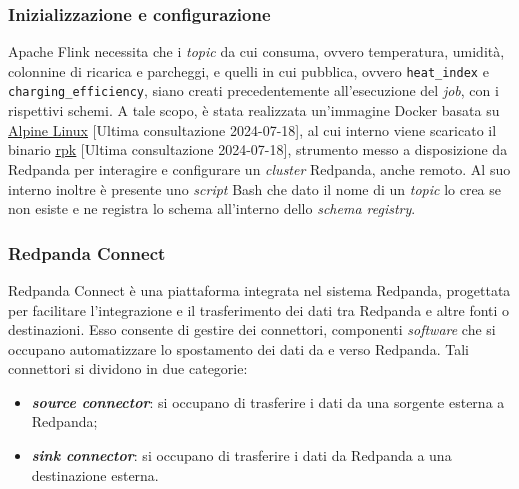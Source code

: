 \subsubsection{Inizializzazione e configurazione}
Apache Flink necessita che i \textit{topic} da cui consuma, ovvero temperatura, umidità, colonnine di ricarica e parcheggi, e quelli in cui pubblica, ovvero \texttt{heat\_index} e \\\texttt{charging\_efficiency},
siano creati precedentemente all'esecuzione del \textit{job}, con i rispettivi schemi. A tale scopo, è stata realizzata un'immagine Docker basata su \href{https://hub.docker.com/_/alpine}{\underline{Alpine Linux}} [Ultima consultazione 2024-07-18],
al cui interno viene scaricato il binario \href{https://docs.redpanda.com/current/get-started/intro-to-rpk/}{\underline{rpk}} [Ultima consultazione 2024-07-18], strumento
messo a disposizione da Redpanda per interagire e configurare un \textit{cluster} Redpanda, anche remoto. Al suo interno inoltre è presente uno \textit{script} Bash che
dato il nome di un \textit{topic} lo crea se non esiste e ne registra lo schema all'interno dello \textit{schema registry}.

\subsubsection{Redpanda Connect}\label{redpanda_connect}
Redpanda Connect è una piattaforma integrata nel sistema Redpanda, progettata per facilitare l'integrazione e il trasferimento dei dati tra Redpanda e altre fonti o destinazioni.
Esso consente di gestire dei connettori, componenti \textit{software} che si occupano automatizzare lo spostamento dei dati da e verso Redpanda. Tali connettori si dividono in due categorie:
\begin{itemize}
	\item \textbf{\textit{source connector}}: si occupano di trasferire i dati da una sorgente esterna a Redpanda;
	\item \textbf{\textit{sink connector}}: si occupano di trasferire i dati da Redpanda a una destinazione esterna.
\end{itemize}

